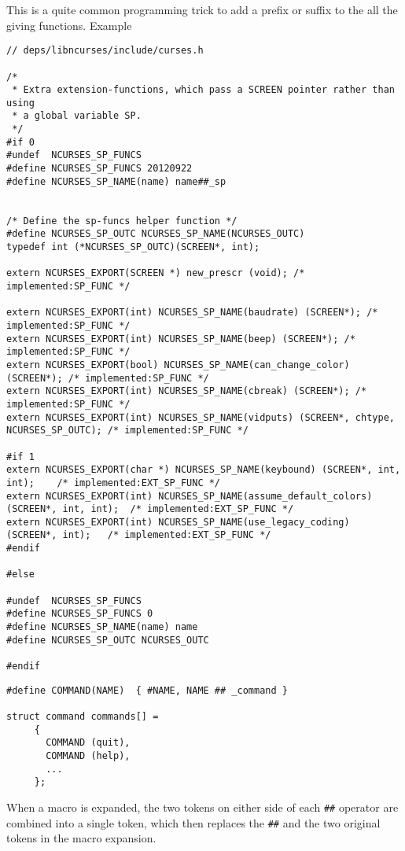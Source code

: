 This is a quite common programming trick to add a prefix or suffix to
the all the giving functions. Example
\begin{verbatim}
// deps/libncurses/include/curses.h

/*
 * Extra extension-functions, which pass a SCREEN pointer rather than using
 * a global variable SP.
 */
#if 0
#undef  NCURSES_SP_FUNCS
#define NCURSES_SP_FUNCS 20120922
#define NCURSES_SP_NAME(name) name##_sp


/* Define the sp-funcs helper function */
#define NCURSES_SP_OUTC NCURSES_SP_NAME(NCURSES_OUTC)
typedef int (*NCURSES_SP_OUTC)(SCREEN*, int);

extern NCURSES_EXPORT(SCREEN *) new_prescr (void); /* implemented:SP_FUNC */

extern NCURSES_EXPORT(int) NCURSES_SP_NAME(baudrate) (SCREEN*); /* implemented:SP_FUNC */
extern NCURSES_EXPORT(int) NCURSES_SP_NAME(beep) (SCREEN*); /* implemented:SP_FUNC */
extern NCURSES_EXPORT(bool) NCURSES_SP_NAME(can_change_color) (SCREEN*); /* implemented:SP_FUNC */
extern NCURSES_EXPORT(int) NCURSES_SP_NAME(cbreak) (SCREEN*); /* implemented:SP_FUNC */
extern NCURSES_EXPORT(int) NCURSES_SP_NAME(vidputs) (SCREEN*, chtype, NCURSES_SP_OUTC); /* implemented:SP_FUNC */

#if 1
extern NCURSES_EXPORT(char *) NCURSES_SP_NAME(keybound) (SCREEN*, int, int);	/* implemented:EXT_SP_FUNC */
extern NCURSES_EXPORT(int) NCURSES_SP_NAME(assume_default_colors) (SCREEN*, int, int);	/* implemented:EXT_SP_FUNC */
extern NCURSES_EXPORT(int) NCURSES_SP_NAME(use_legacy_coding) (SCREEN*, int);	/* implemented:EXT_SP_FUNC */
#endif

#else

#undef  NCURSES_SP_FUNCS
#define NCURSES_SP_FUNCS 0
#define NCURSES_SP_NAME(name) name
#define NCURSES_SP_OUTC NCURSES_OUTC

#endif

\end{verbatim}




\begin{verbatim}
#define COMMAND(NAME)  { #NAME, NAME ## _command }

struct command commands[] =
     {
       COMMAND (quit),
       COMMAND (help),
       ...
     };
\end{verbatim}

When a macro is expanded, the two tokens on either side of each \verb!##! operator
are combined into a single token, which then replaces the \verb!##! and the two
original tokens in the macro expansion.

